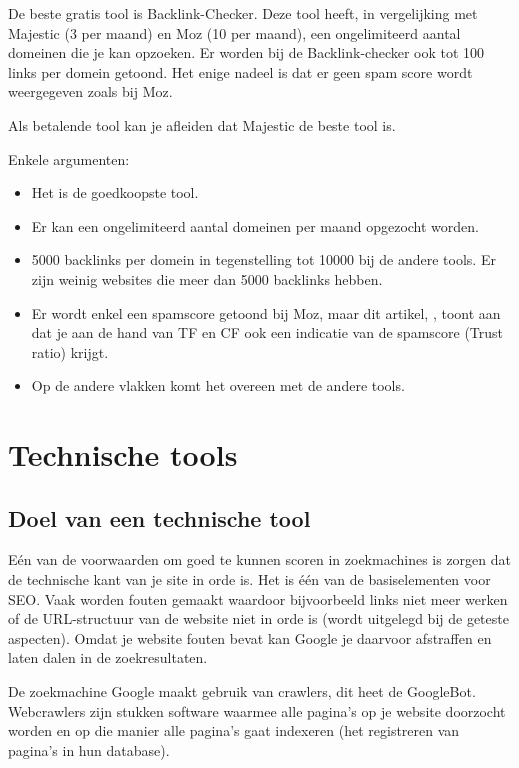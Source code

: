 De beste gratis tool is Backlink-Checker. Deze tool heeft, in vergelijking met Majestic (3 per maand) en Moz (10 per maand), een ongelimiteerd aantal domeinen die je kan opzoeken. Er worden bij de Backlink-checker ook tot 100 links per domein getoond. Het enige nadeel is dat er geen spam score wordt weergegeven zoals bij Moz. 

Als betalende tool kan je afleiden dat Majestic de beste tool is.

Enkele argumenten: 
\begin{itemize}
\item Het is de goedkoopste tool.
\item Er kan een ongelimiteerd aantal domeinen per maand opgezocht worden. 
\item 5000 backlinks per domein in tegenstelling tot 10000 bij de andere tools. Er zijn weinig websites die meer dan 5000 backlinks hebben.
\item Er wordt enkel een spamscore getoond bij Moz, maar dit artikel, \textcite{MAJESTIC} , toont aan dat je aan de hand van TF en CF ook een indicatie van de spamscore (Trust ratio) krijgt. 
\item Op de andere vlakken komt het overeen met de andere tools.
\end{itemize}

\section{Technische tools}
\label{ch: Technische tools}

\subsection{Doel van een technische tool}
\label{ch: Doel van een technische tool}

Eén van de voorwaarden om goed te kunnen scoren in zoekmachines is zorgen dat de technische kant van je site in orde is. Het is één van de basiselementen voor SEO. Vaak worden fouten gemaakt waardoor bijvoorbeeld links niet meer werken of de URL-structuur van de website niet in orde is (wordt uitgelegd bij de geteste aspecten). Omdat je website fouten bevat kan Google je daarvoor afstraffen en laten dalen in de zoekresultaten. 

De zoekmachine Google maakt gebruik van crawlers, dit heet de GoogleBot. Webcrawlers zijn stukken software waarmee alle pagina’s op je website doorzocht worden en op die manier alle pagina’s gaat indexeren (het registreren van pagina’s in hun database). 

